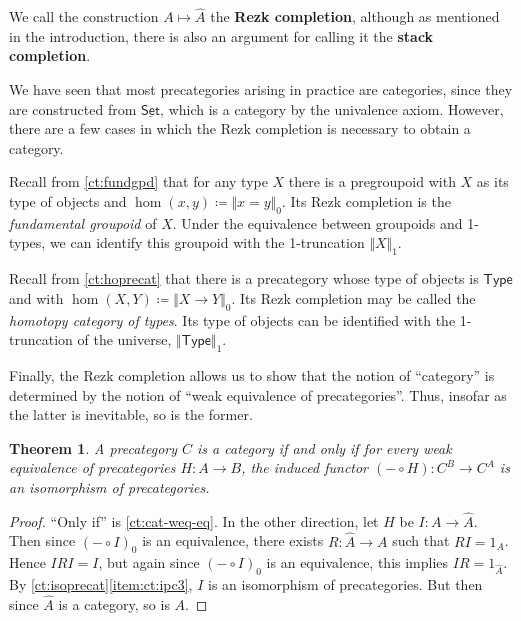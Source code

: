 \documentclass{mscs}
\newcommand{\defeq}{\coloneqq}  %
\newcommand{\type}{\ensuremath{\mathsf{Type}}\xspace}
\renewcommand{\set}{\ensuremath{\mathsf{Set}}\xspace}
\newcommand{\trunc}[2]{\Vert #2\Vert_{#1}}
\def\pizero{\trunc0}
\newcommand{\uset}{\ensuremath{\underline{\set}}\xspace}
\newtheorem{thm}{Theorem}[section]
\numberwithin{equation}{section}
\begin{document}
We call the construction $A\mapsto \widehat A$ the \textbf{Rezk completion}, although as mentioned in the introduction, there is also an argument for calling it the \textbf{stack completion}.

We have seen that most precategories arising in practice are categories, since they are constructed from \uset, which is a category by the univalence axiom.
However, there are a few cases in which the Rezk completion is necessary to obtain a category.

\begin{eg}
  Recall from \autoref{ct:fundgpd} that for any type $X$ there is a pregroupoid with $X$ as its type of objects and $\hom(x,y) \defeq \pizero{x=y}$.
  Its Rezk completion is the \emph{fundamental groupoid} of $X$.
  Under the equivalence between groupoids and 1-types, we can identify this groupoid with the 1-truncation $\trunc1X$.
\end{eg}

\begin{eg}\label{ct:hocat}
  Recall from \autoref{ct:hoprecat} that there is a precategory whose type of objects is \type and with $\hom(X,Y) \defeq \pizero{X\to Y}$.
  Its Rezk completion may be called the \emph{homotopy category of types}.
  Its type of objects can be identified with the 1-truncation of the universe, $\trunc1\type$.
\end{eg}

Finally, the Rezk completion allows us to show that the notion of ``category'' is determined by the notion of ``weak equivalence of precategories''.
Thus, insofar as the latter is inevitable, so is the former.

\begin{thm}
  A precategory $C$ is a category if and only if for every weak equivalence of precategories $H:A\to B$, the induced functor $(-\circ H):C^B \to C^A$ is an isomorphism of precategories.
\end{thm}
\begin{proof}
  ``Only if'' is \autoref{ct:cat-weq-eq}.
  In the other direction, let $H$ be $I:A\to\widehat A$.
  Then since $(-\circ I)_0$ is an equivalence, there exists $R:\widehat A\to A$ such that $RI=1_A$.
  Hence $IRI=I$, but again since $(-\circ I)_0$ is an equivalence, this implies $IR =1_{\widehat A}$.
  By \autoref{ct:isoprecat}\ref{item:ct:ipc3}, $I$ is an isomorphism of precategories.
  But then since $\widehat A$ is a category, so is $A$.
\end{proof}



\end{document}
